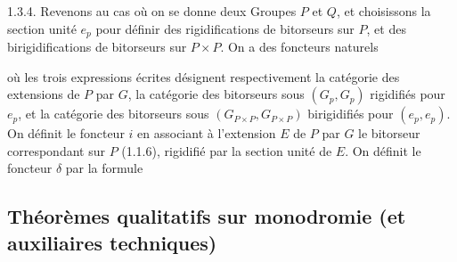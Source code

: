 \documentclass[11pt,a4paper]{article}
\begin{document}
1.3.4. Revenons au cas où on se donne deux Groupes $P$ et $Q$, et choisissons la
section unité $e_{p}$ pour définir des rigidifications de bitorseurs sur $P$, et
des birigidifications de bitorseurs sur $P \times P$. On a des foncteurs
naturels


où les trois expressions écrites désignent respectivement la catégorie des
extensions de  $P$ par $G$, la catégorie des bitorseurs sous
$(G_{p}, G_{p})$ rigidifiés pour $e_{p}$, et la catégorie des bitorseurs sous
$(G_{P \times P}, G_{P \times P})$ birigidifiés pour $(e_{p}, e_{p})$. On
définit le foncteur $i$ en associant à l'extension $E$ de $P$ par $G$ le
\struck{\ill} bitorseur correspondant sur $P$ (1.1.6), rigidifié par la section
unité de $E$. On définit le foncteur $\delta$ par la formule




\subsection*{Théorèmes qualitatifs sur monodromie (et auxiliaires techniques)}

\end{document}
